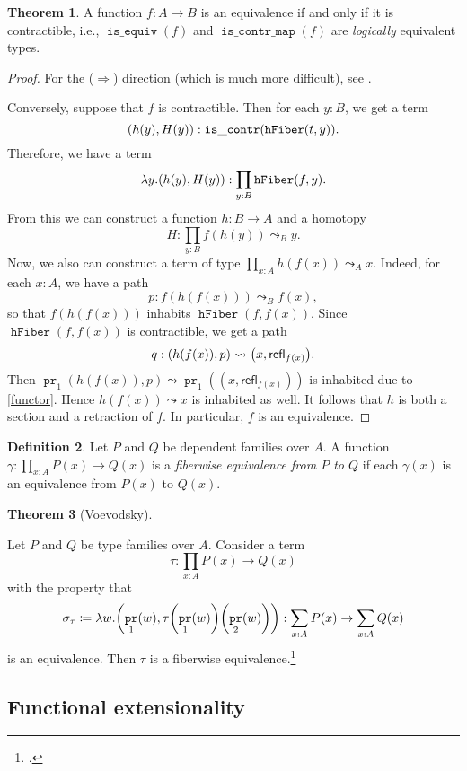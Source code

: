 \documentclass[10pt,letterpaper,cm]{nupset}
\theoremstyle{definition}
\newtheorem{definition}{Definition}[subsection]
\theoremstyle{theorem}
\newtheorem{theorem}[definition]{Theorem}
\theoremstyle{remark}
\newcommand{\refl}{\mathsf{refl}}
\newcommand{\0}{\mathbf{0}}
\newcommand{\1}{\mathbf{1}}
\newcommand{\2}{\mathbf{2}}
\DeclareMathOperator{\isequiv}{\mathtt{is\_equiv}}
\DeclareMathOperator{\hfiber}{\mathtt{hFiber}}
\DeclareMathOperator{\iscont}{\mathtt{is\_contr}}
\DeclareMathOperator{\iscontmap}{\mathtt{is\_contr\_map}}
\DeclareMathOperator{\pr}{\mathtt{pr}}
\begin{document}
\begin{theorem}\label{equiv-cont}
 A function $f : A \to B$ is an equivalence if and only if it is contractible, i.e.,  $\isequiv(f)$ and $\iscontmap(f)$ are \emph{logically} equivalent types.
\end{theorem}
\begin{proof}
For the ($\Longrightarrow$) direction (which is much more difficult), see \cite[Theorem 6.3.3]{Rijke}.

\smallskip
Conversely, suppose that $f$ is contractible. Then for each $y:B$, we get a term $$\mleft(h(y), H(y)\mright) :\iscont(\hfiber(t,y)).$$ Therefore, we have a term $$ \lambda y. \mleft(h(y), H(y)\mright) : \prod_{y:B}\hfiber(f,y)    .$$ From this we can construct a function $h: B \to A$ and a homotopy $$H: \prod_{y:B} f(h(y)) \leadsto_B y.$$ Now, we also can construct a term of type $\prod_{x : A} h(f(x)) \leadsto_A x$. Indeed, for each $x:A$, we have a path $$p: f(h(f(x))) \leadsto_B f(x),$$ so that $f(h(f(x)))$ inhabits $\hfiber(f, f(x))$. Since $\hfiber(f, f(x))$ is contractible, we get a path $$q : \mleft(h(f(x)), p\mright) \leadsto \mleft(x, \refl_{f(x)}\mright).$$ Then $\pr_1(h(f(x)), p) \leadsto \pr_1((x, \refl_{f(x)}))$ is inhabited due to \cref{functor}. Hence $h(f(x)) \leadsto x$ is inhabited as well. It follows that $h$ is both a section and a retraction of $f$. In particular, $f$ is an equivalence. 
\end{proof}


\begin{definition}
Let $P$ and $Q$ be dependent families over $A$. A function $\gamma : \prod_{x:A}P(x) \to Q(x)$ is a \textit{fiberwise equivalence from $P$ to $Q$} if each $\gamma(x)$ is an equivalence from  $P(x)$ to $Q(x)$. 
\end{definition}

\begin{theorem}[Voevodsky]\label{fwe}

Let $P$ and $Q$ be type families over $A$. Consider a term $$\tau : \prod_{x:A} P(x) \to Q(x)$$ with the property that $$\sigma_{\tau} \coloneqq \lambda w .\mleft(\pr_{1}(w), \tau\mleft(\pr_{1}(w)\mright)\mleft(\pr_{2}(w)\mright)\mright) :    \sum_{x:A}P(x) \to \sum_{x:A}Q(x)  $$ is an equivalence. Then $\tau$ is a fiberwise equivalence.\footnote{\cite[Theorem 2.4.19]{Rijke2}.} 
\end{theorem}

\subsection*{Functional extensionality}
\end{document}
